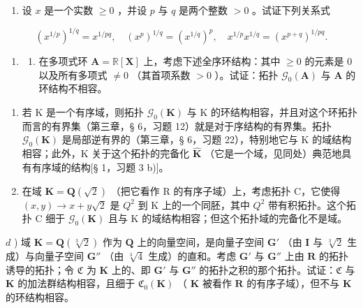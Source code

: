 \BourbakiExerciseGroup

\begin{enumerate}
\def\labelenumi{\arabic{enumi})}
\tightlist
\item
设 \(x\) 是一个实数 \(\geqslant 0\) ，并设 \(p\) 与 \(q\) 是两个整数 \(> 0\) 。试证下列关系式
\end{enumerate}

\[
(x ^ {1 / p}) ^ {1 / q} = x ^ {1 / p q}, \quad (x ^ {p}) ^ {1 / q} = (x ^ {1 / q}) ^ {p}, \quad x ^ {1 / p} x ^ {1 / q} = (x ^ {p + q}) ^ {1 / p q}.
\]

\begin{enumerate}
\def\labelenumi{\arabic{enumi})}
\setcounter{enumi}{1}
\tightlist
\item
  \begin{enumerate}
  \def\labelenumii{\alph{enumii})}
  \tightlist
  \item
在多项式环 \(\mathbf{A} = \mathbb{R}[\mathbf{X}]\) 上，考虑下述全序环结构：其中 \(\geqslant 0\) 的元素是 \(0\) 以及所有多项式 \(\neq 0\) （其首项系数 \(>0\) ）。试证：拓扑 \(\mathcal{G}_{0}(\mathbf{A})\) 与 \(\mathbf{A}\) 的环结构不相容。
  \end{enumerate}
\end{enumerate}

\begin{enumerate}
\def\labelenumi{\alph{enumi})}
\setcounter{enumi}{1}
\item
若 K 是一个有序域，则拓扑 \(\mathcal{G}_{0}(\mathbf{K})\) 与 K 的环结构相容，并且对这个环拓扑而言的有界集（第三章，§ 6，习题 12）就是对于序结构的有界集。拓扑 \(\mathcal{G}_{0}(\mathbf{K})\) 是局部逆有界的（第三章，§ 6，习题 22），特别地它与 K 的域结构相容；此外，K 关于这个拓扑的完备化 \(\hat{\mathbf{K}}\) （它是一个域，见同处）典范地具有有序域的结构{[}§ 1，习题 3 b){]}。
\item
在域 \(\mathbf{K} = \mathbf{Q}(\sqrt{2})\) （把它看作 R 的有序子域）上，考虑拓扑 C，它使得 \((x, y) \to x + y\sqrt{2}\) 是 \(Q^{2}\) 到 K 上的一个同胚，其中 \(Q^{2}\) 带有积拓扑。这个拓扑 C 细于 \(\mathcal{G}_{0}(\mathbf{K})\) 且与 K 的域结构相容；但这个拓扑域的完备化不是域。
\end{enumerate}

\(d\) ) 域 \(\mathbf{K} = \mathbf{Q}(\sqrt[3]{2})\) 作为 \(\mathbf{Q}\) 上的向量空间，是向量子空间 \(\mathbf{G}'\) （由 \(\mathbf{I}\) 与 \(\sqrt[3]{2}\) 生成）与向量子空间 \(\mathbf{G}''\) （由 \(\sqrt[3]{4}\) 生成）的直和。考虑 \(\mathbf{G}'\) 与 \(\mathbf{G}''\) 上由 \(\mathbf{R}\) 的拓扑诱导的拓扑；令 \(\mathfrak{C}\) 为 \(\mathbf{K}\) 上的、即 \(\mathbf{G}'\) 与 \(\mathbf{G}''\) 的拓扑之积的那个拓扑。试证：\(\mathfrak{C}\) 与 \(\mathbf{K}\) 的加法群结构相容，且细于 \(\mathfrak{C}_0(\mathbf{K})\) （ \(\mathbf{K}\) 被看作 \(\mathbf{R}\) 的有序子域），但不与 \(\mathbf{K}\) 的环结构相容。

